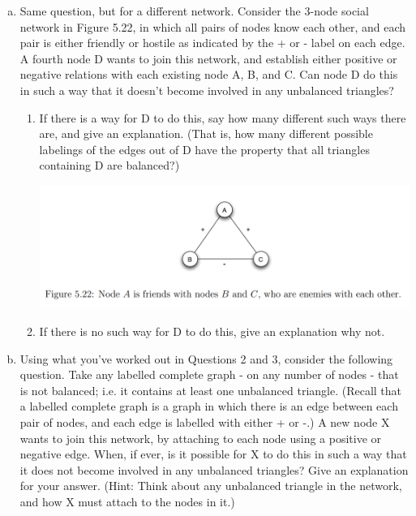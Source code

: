 \documentclass[11pt]{article}
\begin{document}
\begin{enumerate}
\begin{enumerate}[(a)]
		\item Same question, but for a different network. Consider the 3-node social network in Figure 5.22, in which all pairs of nodes know each other, and each pair is either friendly or hostile as indicated by the + or - label on each edge. A fourth node D wants to join this network, and establish either positive or negative relations with each existing node A, B, and C. Can node D do this in such a way that it doesn’t become involved in any unbalanced triangles?
		\begin{enumerate}[*]
			\item  If there is a way for D to do this, say how many different such ways there are, and give an explanation. (That is, how many different possible labelings of the edges out of D have the property that all triangles containing D are balanced?)
			\begin{center}
				\includegraphics[scale=1]{Figure_5_22}\\
			\end{center}
			\item If there is no such way for D to do this, give an explanation why not.
		\end{enumerate}
		\item Using what you’ve worked out in Questions 2 and 3, consider the following question. Take any labelled complete graph - on any number of nodes - that is not balanced; i.e. it contains at least one unbalanced triangle. (Recall that a labelled complete graph is a graph in which there is an edge between each pair of nodes, and each edge is labelled with either + or -.) A new node X wants to join this network, by attaching to each node using a positive or negative edge. When, if ever, is it possible for X to do this in such a way that it does not become involved in any unbalanced triangles? Give an explanation for your answer. (Hint: Think about any unbalanced triangle in the network, and how X must attach to the nodes in it.)
	\end{enumerate}
\end{enumerate}
\end{document}
